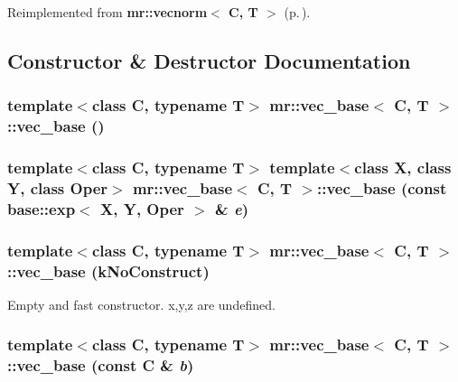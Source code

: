 Reimplemented from {\bf mr::vecnorm$<$ C, T $>$} {\rm (p.\,\pageref{structmr_1_1vecnorm_w0})}.

\subsection{Constructor \& Destructor Documentation}
\subsubsection{\setlength{\rightskip}{0pt plus 5cm}template$<$class C, typename T$>$ {\bf mr::vec\_\-base}$<$ C, T $>$::{\bf vec\_\-base} ()\hspace{0.3cm}{\tt  [inline]}}\label{structmr_1_1vec__base_z58_0}


\subsubsection{\setlength{\rightskip}{0pt plus 5cm}template$<$class C, typename T$>$ template$<$class X, class Y, class Oper$>$ {\bf mr::vec\_\-base}$<$ C, T $>$::{\bf vec\_\-base} (const {\bf base::exp}$<$ X, Y, Oper $>$ \& {\em e})\hspace{0.3cm}{\tt  [inline]}}\label{structmr_1_1vec__base_z58_1}


\subsubsection{\setlength{\rightskip}{0pt plus 5cm}template$<$class C, typename T$>$ {\bf mr::vec\_\-base}$<$ C, T $>$::{\bf vec\_\-base} ({\bf k\-No\-Construct})\hspace{0.3cm}{\tt  [inline]}}\label{structmr_1_1vec__base_z58_2}


Empty and fast constructor. x,y,z are undefined. 

\subsubsection{\setlength{\rightskip}{0pt plus 5cm}template$<$class C, typename T$>$ {\bf mr::vec\_\-base}$<$ C, T $>$::{\bf vec\_\-base} (const C \& {\em b})\hspace{0.3cm}{\tt  [inline]}}\label{structmr_1_1vec__base_z58_3}


